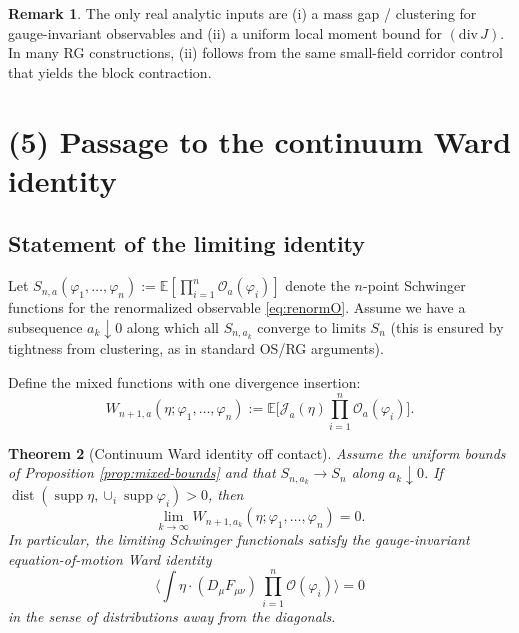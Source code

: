 \documentclass[11pt]{article}
\newtheorem{theorem}{Theorem}[section]
\theoremstyle{definition}
\newtheorem{remark}[theorem]{Remark}
\newcommand{\E}{\mathbb{E}}
\newcommand{\1}{\mathbf{1}}
\newcommand{\dist}{\operatorname{dist}}
\newcommand{\supp}{\operatorname{supp}}
\begin{document}
\begin{remark}
The only real analytic inputs are (i) a mass gap / clustering for gauge-invariant observables and (ii) a uniform local moment bound for $(\mathrm{div}\,J)$.
In many RG constructions, (ii) follows from the same small-field corridor control that yields the block contraction.
\end{remark}

\section{(5) Passage to the continuum Ward identity}

\subsection{Statement of the limiting identity}
Let $S_{n,a}(\varphi_1,\dots,\varphi_n):=\E[\prod_{i=1}^n \mathcal{O}_a(\varphi_i)]$ denote the $n$-point Schwinger functions for the renormalized observable \eqref{eq:renormO}.
Assume we have a subsequence $a_k\downarrow 0$ along which all $S_{n,a_k}$ converge to limits $S_n$ (this is ensured by tightness from clustering, as in standard OS/RG arguments).

Define the mixed functions with one divergence insertion:
\begin{equation}
  W_{n+1,a}(\eta;\varphi_1,\dots,\varphi_n)
  :=\E\Big[\mathcal{J}_a(\eta)\prod_{i=1}^n \mathcal{O}_a(\varphi_i)\Big].
\end{equation}

\begin{theorem}[Continuum Ward identity off contact]\label{thm:cont-ward-off}
Assume the uniform bounds of Proposition \ref{prop:mixed-bounds} and that $S_{n,a_k}\to S_n$ along $a_k\downarrow 0$.
If $\dist(\supp\eta,\cup_i \supp\varphi_i)>0$, then
\begin{equation}\label{eq:ward-limit-off}
  \lim_{k\to\infty} W_{n+1,a_k}(\eta;\varphi_1,\dots,\varphi_n)=0.
\end{equation}
In particular, the limiting Schwinger functionals satisfy the gauge-invariant equation-of-motion Ward identity
\begin{equation*}
  \Big\langle \int \eta\cdot (D_\mu F_{\mu\nu})\, \prod_{i=1}^n \mathcal{O}(\varphi_i)\Big\rangle =0
\end{equation*}
in the sense of distributions away from the diagonals.
\end{theorem}
\end{document}
